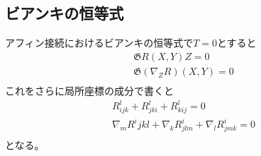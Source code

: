     \subsection{ビアンキの恒等式}
        アフィン接続におけるビアンキの恒等式で$T = 0$とすると
        \begin{gather*}
            \mathfrak{G}{R(X, Y)Z} = 0\\
            \mathfrak{G}{(\nabla_ZR)(X, Y)} = 0\\
        \end{gather*}
        これをさらに局所座標の成分で書くと
        \begin{gather*}
            R^l_{ijk} + R^l_{jki} + R^l_{kij} = 0\\
            \nabla_mR^i{jkl} + \nabla_kR^i_{jlm} + \nabla_lR^i_{jmk} = 0\\
        \end{gather*}
        となる。



